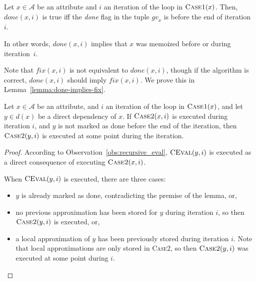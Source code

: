 {\begin{definition}
\end{definition}

\begin{definition}
  Let $x \in \mathcal{A}$ be an attribute
  and $i$ an iteration of the loop in $\textsc{Case1}(x)$.
  Then, $\mathit{done}(x, i)$ is true iff the \emph{done} flag in the
  tuple $\mathit{gv}_x$ is \true{} before the end of iteration $i$.

  In other words, $\mathit{done}(x, i)$ implies that $x$ was memoized before
  or during iteration~$i$.
\end{definition}

Note that $\mathit{fix}(x, i)$ is not equivalent to $\mathit{done}(x, i)$,
though if the algorithm is correct,
$\mathit{done}(x, i)$ should imply $\mathit{fix}(x, i)$.
We prove this in Lemma~\ref{lemma:done-implies-fix}.

\begin{lemma}
  Let $x \in \mathcal{A}$ be an attribute,
  and $i$ an iteration of the loop in $\textsc{Case1}(x)$,
  and let $y \in d(x)$ be a direct dependency of $x$.
  If $\textsc{Case2}(x, i)$ is executed during iteration $i$,
  and $y$ is not marked as done before the end of the iteration,
  then $\textsc{Case2}(y, i)$ is executed at some point during the iteration.


  \label{lemma:nonfinal_case2}
\end{lemma}

\begin{proof}
  According to Observation~\ref{obs:recursive_eval}, $\textsc{CEval}(y, i)$ is executed as a direct
  consequence of executing $\textsc{Case2}(x, i)$.

  When $\textsc{CEval}(y,i)$ is executed, there are three cases:

  \begin{itemize}
    \item $y$ is already marked as done, contradicting the premise of the lemma, or,
    \item no previous approximation has been stored for $y$ during iteration $i$,
      so then $\textsc{Case2}(y, i)$ is executed, or,
    \item a local approximation of $y$ has been previously stored during iteration $i$.
      Note that local approximations are only stored in \textsc{Case2},
      so then $\textsc{Case2}(y, i)$ was executed at some point during $i$.
  \end{itemize}
\end{proof}

}
